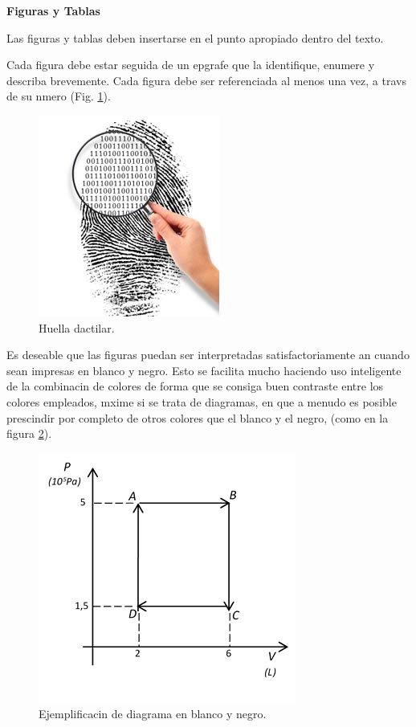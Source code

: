 
\textbf{Figuras y Tablas}

Las figuras y tablas deben insertarse en el punto apropiado dentro del texto.

Cada figura debe estar seguida de un epgrafe que la identifique, enumere y describa brevemente. Cada figura debe ser referenciada al menos una vez, a travs de su nmero (Fig. \ref{fig:huella}).

\begin{figure}[H]
\begin{center}
\includegraphics[scale = .5]{./capitulo_04/huella}
\caption{Huella dactilar.}
\label{fig:huella}
\end{center}
\end{figure}

Es deseable que las figuras puedan ser interpretadas satisfactoriamente an cuando sean impresas en blanco y negro. Esto se facilita mucho haciendo uso inteligente de la combinacin de colores de forma que se consiga buen contraste entre los colores empleados, mxime si se trata de diagramas, en que a menudo es posible prescindir por completo de otros colores que el blanco y el negro, (como en la figura \ref{fig:termodin}).

\begin{figure}[H]
\begin{center}
\includegraphics{./capitulo_04/termodin.png}
\caption{Ejemplificacin de diagrama en blanco y negro.}
\label{fig:termodin}
\end{center}
\end{figure}

